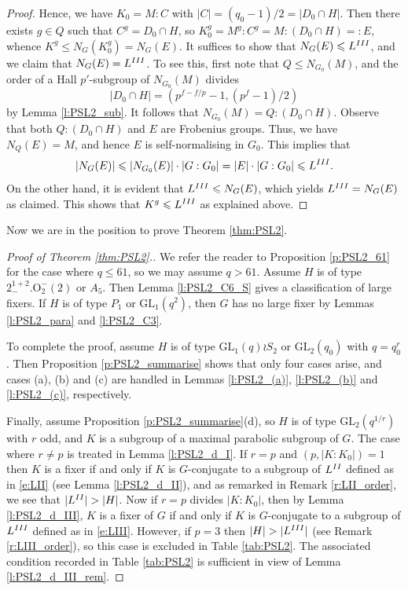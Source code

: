 \documentclass[twoside,a4paper,reqno,11pt]{amsart}
\newcommand{\<}{\langle}
\renewcommand{\>}{\rangle}
\newcommand{\leqs}{\leqslant}
\newcommand{\GL}{\mathrm{GL}}
\theoremstyle{definition}
\begin{document}
\begin{proof}
		Hence, we have $K_0 = M{:}C$ with $|C| = (q_0-1)/2 = |D_0\cap H|$. Then there exists $g\in Q$ such that $C^g = D_0\cap H$, so $K_0^g = M^g{:}C^g = M{:}(D_0\cap H)=:E$, whence $K^g\leqs N_G(K_0^g) = N_G(E)$. It suffices to show that $N_G(E)\leqs L^{\rm III}$, and we claim that $N_G(E) = L^{\rm III}$. To see this, first note that $Q\leqs N_{G_0}(M)$, and the order of a Hall $p'$-subgroup of $N_{G_0}(M)$ divides
		\begin{equation*}
		|D_0\cap H| = (p^{f-f/p}-1,(p^f-1)/2)
		\end{equation*}
		by Lemma \ref{l:PSL2_sub}. It follows that $N_{G_0}(M) = Q{:}(D_0\cap H)$. Observe that both $Q{:}(D_0\cap H)$ and $E$ are Frobenius groups. Thus, we have $N_{Q}(E) = M$, and hence $E$ is self-normalising in $G_0$. This implies that
		\begin{equation*}
		|N_G(E)|\leqs |N_{G_0}(E)|\cdot |G:G_0| = |E|\cdot |G:G_0|\leqs L^{\rm III}.
		\end{equation*}
		On the other hand, it is evident that $L^{\rm III}\leqs N_G(E)$, which yields $L^{\rm III} = N_G(E)$ as claimed. This shows that $K^g\leqs L^{\rm III}$ as explained above.
	\end{proof}
	
	
	Now we are in the position to prove Theorem \ref{thm:PSL2}.
	
	\begin{proof}[Proof of Theorem \ref{thm:PSL2}.]
		We refer the reader to Proposition \ref{p:PSL2_61} for the case where $q\leqs 61$, so we may assume $q > 61$. Assume $H$ is of type $2^{1+2}_-.\mathrm{O}_2^-(2)$ or $A_5$. Then Lemma \ref{l:PSL2_C6_S} gives a classification of large fixers. If $H$ is of type $P_1$ or $\GL_1(q^2)$, then $G$ has no large fixer by Lemmas \ref{l:PSL2_para} and \ref{l:PSL2_C3}.
		
		To complete the proof, assume $H$ is of type $\GL_1(q)\wr S_2$ or $\GL_2(q_0)$ with $q = q_0^r$. Then Proposition \ref{p:PSL2_summarise} shows that only four cases arise, and cases (a), (b) and (c) are handled in Lemmas \ref{l:PSL2_(a)}, \ref{l:PSL2_(b)} and \ref{l:PSL2_(c)}, respectively.
		
		Finally, assume Proposition \ref{p:PSL2_summarise}(d), so $H$ is of type $\GL_2(q^{1/r})$ with $r$ odd, and $K$ is a subgroup of a maximal parabolic subgroup of $G$. The case where $r\ne p$ is treated in Lemma \ref{l:PSL2_d_I}. If $r = p$ and $(p,|K:K_0|) = 1$ then $K$ is a fixer if and only if $K$ is $G$-conjugate to a subgroup of $L^{\rm II}$ defined as in \eqref{e:LII} (see Lemma \ref{l:PSL2_d_II}), and as remarked in Remark \ref{r:LII_order}, we see that $|L^{\rm II}| > |H|$. Now if $r = p$ divides $|K:K_0|$, then by Lemma \ref{l:PSL2_d_III}, $K$ is a fixer of $G$ if and only if $K$ is $G$-conjugate to a subgroup of $L^{\rm III}$ defined as in \eqref{e:LIII}. However, if $p = 3$ then $|H| > |L^{\rm III}|$ (see Remark \ref{r:LIII_order}), so this case is excluded in Table \ref{tab:PSL2}. The associated condition recorded in Table \ref{tab:PSL2} is sufficient in view of Lemma \ref{l:PSL2_d_III_rem}.
	\end{proof}
	
\end{document}
